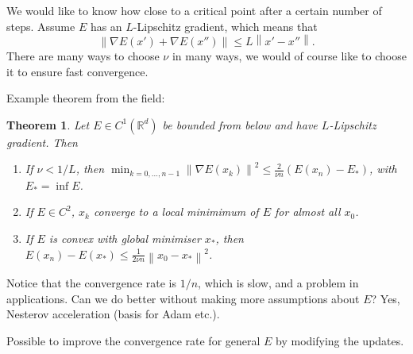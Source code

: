 \documentclass[12pt]{article}
\newtheorem{theorem}{Theorem}[section]
\theoremstyle{definition}
\newcommand{\real}{\mathbb{R}}   %
\newcommand\norm[1]{\left\lVert#1\right\rVert}
\begin{document}
We would like to know how close to a critical point after a certain number of steps. Assume $E$ has an $L$-Lipschitz gradient, which means that
\begin{equation*}
    \norm{\nabla E(x') + \nabla E(x'')} \leq L \norm{x'-x''}.
\end{equation*}
There are many ways to choose $\nu$ in many ways, we would of course like to choose it to ensure fast convergence. 

Example theorem from the field:
\begin{theorem}
    Let $E\in C^1(\real^d)$ be bounded from below and have $L$-Lipschitz gradient. Then
    \begin{enumerate}[label=(\alph*)]
        \item If $\nu<1/L$, then $\min_{k=0,\dots,n-1} \norm{\nabla E(x_k)}^2\leq \frac{2}{\nu n} (E(x_n)- E_*)$, with $E_* = \inf E$.
        \item If $E\in C^2$, $x_k$ converge to a local minimimum of $E$ for almost all $x_0$.
        \item If $E$ is convex with global minimiser $x_*$, then $E(x_n)-E(x_*)\leq \frac{1}{2\nu n} \norm{x_0-x_*}^2$.
    \end{enumerate}
\end{theorem}
Notice that the convergence rate is $1/n$, which is slow, and a problem in applications. Can we do better without making more assumptions about $E$? Yes, Nesterov acceleration (basis for Adam etc.). 

Possible to improve the convergence rate for general $E$ by modifying the updates. 
\end{document}
